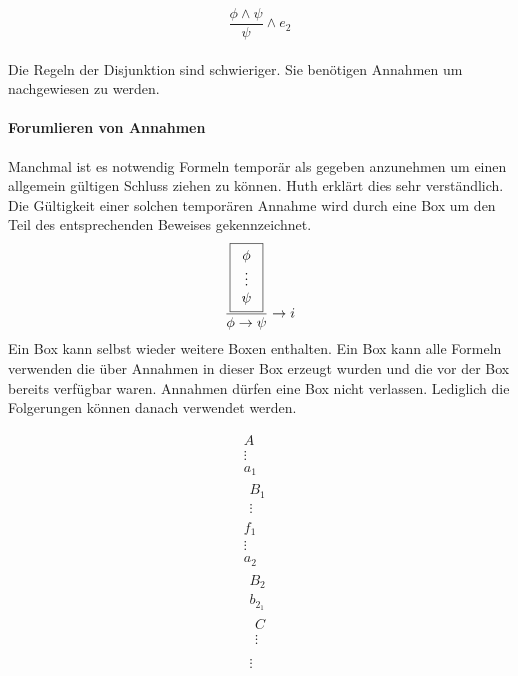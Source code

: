 \begin{equation}
	\label{eq:e2Conjunction}
	\frac{\phi \wedge \psi}{\psi} \wedge e_2
\end{equation}
\\
Die Regeln der Disjunktion sind schwieriger.
Sie benötigen Annahmen um nachgewiesen zu werden.

\paragraph{Forumlieren von Annahmen}
Manchmal ist es notwendig Formeln temporär als gegeben anzunehmen um einen allgemein gültigen Schluss ziehen zu können. Huth \cite[S.11]{huth2004logic} erklärt dies sehr verständlich.\\
Die Gültigkeit einer solchen temporären Annahme wird durch eine Box um den Teil des entsprechenden Beweises gekennzeichnet.\\
\begin{equation}
	\label{eq:iImplication}
	\frac{
		\boxed{ \begin{array}{c} 
			\phi\\
			\vdots\\
			\psi\\
		 \end{array} }
	}
	{\phi \rightarrow \psi} \rightarrow i
\end{equation}
Ein Box kann selbst wieder weitere Boxen enthalten.
Ein Box kann alle Formeln verwenden die über Annahmen in dieser Box erzeugt wurden und die vor der Box bereits verfügbar waren.
Annahmen dürfen eine Box nicht verlassen. Lediglich die Folgerungen können danach verwendet werden.

\begin{equation}
	\boxed{\begin{array}{c}
		A\\
		\vdots\\
		a_1\\
		\boxed{\begin{array}{c}
		B_1\\
		\vdots
		\end{array}}\\
		f_1\\
		\vdots\\
		a_2\\
		\boxed{\begin{array}{c}
		B_2\\
		b_{2_1}\\
		\boxed{\begin{array}{c}
		C\\
		\vdots\\
		\end{array}}\\
		\vdots\\
		\end{array}}
	\end{array}}
\end{equation}


